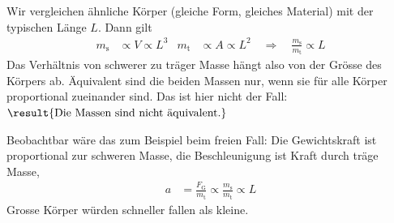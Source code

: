 Wir vergleichen ähnliche Körper (gleiche Form, gleiches Material) mit der typischen Länge $L$. Dann gilt
\begin{align}
 m_\text{s} &\propto V \propto L^3 & m_\text{t} &\propto A \propto L^2
 \quad\Rightarrow\quad \frac{m_\text{s}}{m_\text{t}} \propto L
\end{align}
Das Verhältnis von schwerer zu träger Masse hängt also von der Grösse des Körpers ab. Äquivalent sind die beiden Massen nur, wenn sie für alle Körper proportional zueinander sind. Das ist hier nicht der Fall: $\result{\text{Die Massen sind nicht äquivalent.}}$

Beobachtbar wäre das zum Beispiel beim freien Fall: Die Gewichtskraft ist proportional zur schweren Masse, die Beschleunigung ist Kraft durch träge Masse,
\begin{align}
 a &= \frac{F_\text{G}}{m_\text{t}} \propto \frac{m_\text{s}}{m_\text{t}} \propto L
\end{align}
Grosse Körper würden schneller fallen als kleine.
